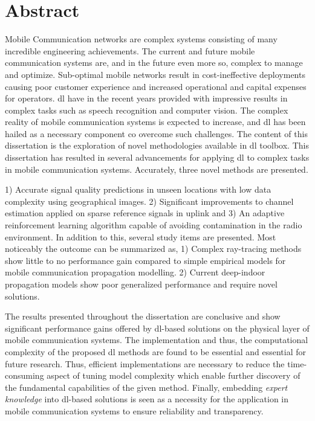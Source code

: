 \chapter*{Abstract}
Mobile Communication networks are complex systems consisting of many incredible engineering achievements. The current and future mobile communication systems are, and in the future even more so, complex to manage and optimize. Sub-optimal mobile networks result in cost-ineffective deployments causing poor customer experience and increased operational and capital expenses for operators. \acrfull{dl} have in the recent years provided with impressive results in complex tasks such as speech recognition and computer vision. The complex reality of mobile communication systems is expected to increase, and \gls{dl} has been hailed as a necessary component co overcome such challenges. The content of this dissertation is the exploration of novel methodologies available in \acrshort{dl} toolbox. This dissertation has resulted in several advancements for applying \gls{dl} to complex tasks in mobile communication systems. Accurately, three novel methods are presented. 

1) Accurate signal quality predictions in unseen locations with low data complexity using geographical images. 2) Significant improvements to channel estimation applied on sparse reference signals in uplink and 3) An adaptive reinforcement learning algorithm capable of avoiding contamination in the radio environment. In addition to this, several study items are presented. Most noticeably the outcome can be summarized as, 1) Complex ray-tracing methods show little to no performance gain compared to simple empirical models for mobile communication propagation modelling. 2) Current deep-indoor propagation models show poor generalized performance and require novel solutions.

The results presented throughout the dissertation are conclusive and show significant performance gains offered by \gls{dl}-based solutions on the physical layer of mobile communication systems. The implementation and thus, the computational complexity of the proposed \gls{dl} methods are found to be essential and essential for future research. Thus, efficient implementations are necessary to reduce the time-consuming aspect of tuning model complexity which enable further discovery of the fundamental capabilities of the given method. Finally, embedding \emph{expert knowledge} into \gls{dl}-based solutions is seen as a necessity for the application in mobile communication systems to ensure reliability and transparency.